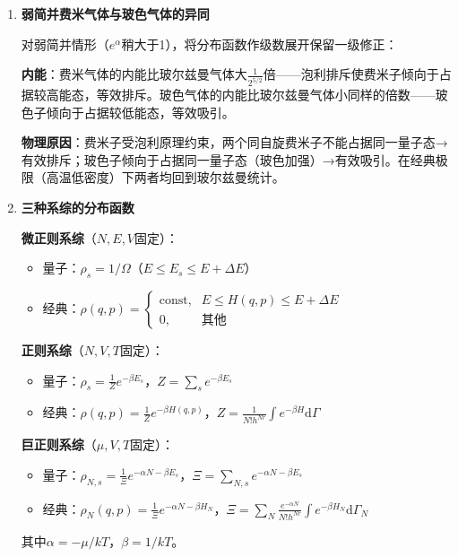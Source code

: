 \documentclass[12pt,a4paper,fontset=mac]{ctexart}
\newcommand{\dd}{\mathrm{d}}
\newcommand{\đ}{\mathrm{đ}}
\begin{document}
\begin{enumerate}
\textbf{本质差异}：泡利不相容原理使费米子不能占据同一量子态→被迫占据高能态→$T=0$时仍有非零动能和压强。玻色子无此限制→全部凝聚到最低能态。

\item \textbf{弱简并费米气体与玻色气体的异同}

对弱简并情形（$e^\alpha$稍大于1），将分布函数作级数展开保留一级修正：

\textbf{内能}：费米气体的内能比玻尔兹曼气体大$\frac{1}{2^{5/2}}$倍——泡利排斥使费米子倾向于占据较高能态，等效排斥。玻色气体的内能比玻尔兹曼气体小同样的倍数——玻色子倾向于占据较低能态，等效吸引。

\textbf{物理原因}：费米子受泡利原理约束，两个同自旋费米子不能占据同一量子态→有效排斥；玻色子倾向于占据同一量子态（玻色加强）→有效吸引。在经典极限（高温低密度）下两者均回到玻尔兹曼统计。

\item \textbf{三种系综的分布函数}

\textbf{微正则系综}（$N,E,V$固定）：
\begin{itemize}
\item 量子：$\rho_s = 1/\Omega$（$E\le E_s\le E+\Delta E$）
\item 经典：$\rho(q,p) = \begin{cases}\text{const}, & E\le H(q,p)\le E+\Delta E\\0, &\text{其他}\end{cases}$
\end{itemize}

\textbf{正则系综}（$N,V,T$固定）：
\begin{itemize}
\item 量子：$\rho_s = \frac{1}{Z}e^{-\beta E_s}$，$Z=\sum_se^{-\beta E_s}$
\item 经典：$\rho(q,p) = \frac{1}{Z}e^{-\beta H(q,p)}$，$Z=\frac{1}{N!h^{Nr}}\int e^{-\beta H}\dd\Gamma$
\end{itemize}

\textbf{巨正则系综}（$\mu,V,T$固定）：
\begin{itemize}
\item 量子：$\rho_{N,s} = \frac{1}{\Xi}e^{-\alpha N-\beta E_s}$，$\Xi=\sum_{N,s}e^{-\alpha N-\beta E_s}$
\item 经典：$\rho_N(q,p) = \frac{1}{\Xi}e^{-\alpha N-\beta H_N}$，$\Xi=\sum_N\frac{e^{-\alpha N}}{N!h^{Nr}}\int e^{-\beta H_N}\dd\Gamma_N$
\end{itemize}

其中$\alpha=-\mu/kT$，$\beta=1/kT$。

\end{enumerate}
\end{document}
